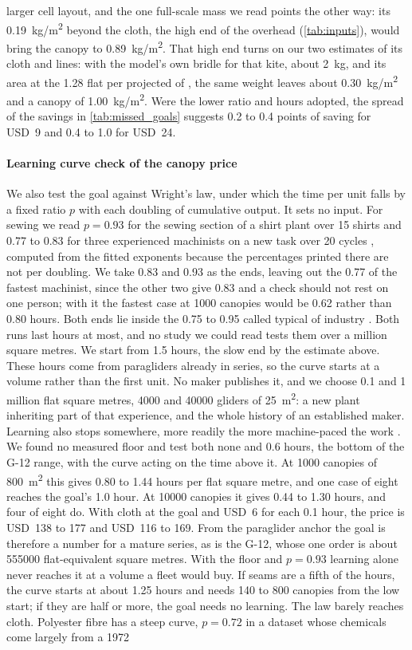 larger cell layout, and the one full-scale mass we read points the other way: its \SI{0.19}{kg/m^2} beyond the cloth, the high end of the overhead (\cref{tab:inputs}), would bring the canopy to \SI{0.89}{kg/m^2}. That high end turns on our two estimates of its cloth and lines: with the model's own bridle for that kite, about 2~kg, and its area at the 1.28 flat per projected of \citet{folkersma2020}, the same weight leaves about \SI{0.30}{kg/m^2} and a canopy of \SI{1.00}{kg/m^2}. Were the lower ratio and hours adopted, the spread of the savings in \cref{tab:missed_goals} suggests 0.2 to 0.4 points of saving for USD~9 and 0.4 to 1.0 for USD~24.

\paragraph{Learning curve check of the canopy price} We also test the goal against Wright's law, under which the time per unit falls by a fixed ratio $p$ with each doubling of cumulative output. It sets no input. For sewing we read $p=0.93$ for the sewing section of a shirt plant over 15 shirts  and 0.77 to 0.83 for three experienced machinists on a new task over 20 cycles , computed from the fitted exponents because the percentages printed there are not per doubling. We take 0.83 and 0.93 as the ends, leaving out the 0.77 of the fastest machinist, since the other two give 0.83 and a check should not rest on one person; with it the fastest case at \num{1000} canopies would be 0.62 rather than 0.80 hours. Both ends lie inside the 0.75 to 0.95 called typical of industry . Both runs last hours at most, and no study we could read tests them over a million square metres. We start from 1.5 hours, the slow end by the estimate above. These hours come from paragliders already in series, so the curve starts at a volume rather than the first unit. No maker publishes it, and we choose 0.1 and 1 million flat square metres, \num{4000} and \num{40000} gliders of \SI{25}{m^2}: a new plant inheriting part of that experience, and the whole history of an established maker. Learning also stops somewhere, more readily the more machine-paced the work . We found no measured floor and test both none and 0.6 hours, the bottom of the G-12 range, with the curve acting on the time above it. At \num{1000} canopies of \SI{800}{m^2} this gives 0.80 to 1.44 hours per flat square metre, and one case of eight reaches the goal's 1.0 hour. At \num{10000} canopies it gives 0.44 to 1.30 hours, and four of eight do. With cloth at the goal and USD~6 for each 0.1 hour, the price is USD~138 to 177 and USD~116 to 169. From the paraglider anchor the goal is therefore a number for a mature series, as is the G-12, whose one order is about \num{555000} flat-equivalent square metres. With the floor and $p=0.93$ learning alone never reaches it at a volume a fleet would buy. If seams are a fifth of the hours, the curve starts at about 1.25 hours and needs 140 to 800 canopies from the low start; if they are half or more, the goal needs no learning. The law barely reaches cloth. Polyester fibre has a steep curve, $p=0.72$ in a dataset whose chemicals come largely from a 1972 